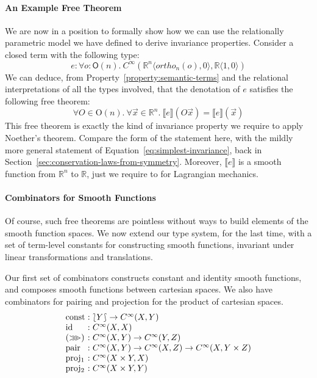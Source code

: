 \documentclass[preprint]{sigplanconf}
\newcommand{\comp}{\mathrel{>\kern-0.45em>\kern-0.45em>}}
\newcommand{\typeOfCartSp}[1]{\lbag #1 \rbag}
\theoremstyle{examplestyle}
\newcommand{\sem}[1]{\llbracket #1 \rrbracket}
\begin{document}
\paragraph{An Example Free Theorem} We are now in a position to
formally show how we can use the relationally parametric model we have
defined to derive invariance properties. Consider a closed term with
the following type:
\begin{displaymath}
  e : \forall o : \mathsf{O}(n).~C^\infty(\mathbb{R}^n\langle \mathit{ortho}_n(o), 0 \rangle, \mathbb{R}\langle 1, 0 \rangle)
\end{displaymath}
We can deduce, from Property~\ref{property:semantic-terms} and the
relational interpretations of all the types involved, that the
denotation of $e$ satisfies the following free theorem:
\begin{displaymath}
  \forall O \in \mathrm{O}(n).~\forall \vec{x} \in \mathbb{R}^n.~\sem{e}(O\vec{x}) = \sem{e}(\vec{x})
\end{displaymath}
This free theorem is exactly the kind of invariance property we
require to apply Noether's theorem. Compare the form of the statement
here, with the mildly more general statement of
Equation~\ref{eq:simplest-invariance}, back in
Section~\ref{sec:conservation-laws-from-symmetry}. Moreover, $\sem{e}$
is a smooth function from $\mathbb{R}^n$ to $\mathbb{R}$, just we
require to for Lagrangian mechanics.

\paragraph{Combinators for Smooth Functions} Of course, such free
theorems are pointless without ways to build elements of the smooth
function spaces. We now extend our type system, for the last time,
with a set of term-level constants for constructing smooth functions,
invariant under linear transformations and translations.

Our first set of combinators constructs constant and identity smooth
functions, and composes smooth functions between cartesian spaces. We
also have combinators for pairing and projection for the product of
cartesian spaces.
\begin{displaymath}
  \begin{array}{l@{\hspace{0.3em}}c@{\hspace{0.3em}}l}
    \mathrm{const} &:& \typeOfCartSp{Y} \to C^\infty(X, Y) \\
    \mathrm{id} &:& C^\infty(X,X) \\
    (\comp) &:& C^\infty(X,Y) \to C^\infty(Y,Z) \\
    \mathrm{pair} &:& C^\infty(X,Y) \to C^\infty(X,Z) \to C^\infty(X, Y \times Z) \\
    \mathrm{proj_1}&:& C^\infty(X \times Y, X) \\
    \mathrm{proj_2}&:& C^\infty(X \times Y, Y) \\
  \end{array}
\end{displaymath}
\end{document}
